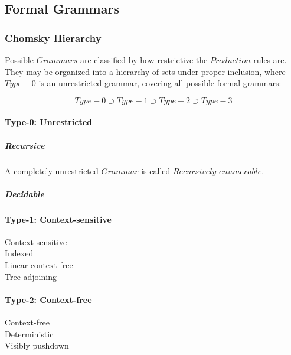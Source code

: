 \documentclass{article}
\begin{document}
\subsection{Formal Grammars}

\subsubsection{Chomsky Hierarchy}

Possible $Grammars$ are classified by how restrictive the $Production$
rules are. They may be organized into a hierarchy of sets under proper
inclusion, where $Type-0$ is an unrestricted grammar, covering all
possible formal grammars:

\[
    Type-0 \supset Type-1 \supset Type-2 \supset Type-3
\]

\paragraph{Type-0: Unrestricted}

    \subparagraph{Recursive}
    A completely unrestricted $Grammar$ is called $Recursively$ $enumerable$.

    \subparagraph{Decidable}

\paragraph{Type-1: Context-sensitive}

    \begin{description}

    \item[Context-sensitive]

    \item[Indexed]

    \item[Linear context-free]

    \item[Tree-adjoining]

    \end{description}

\paragraph{Type-2: Context-free}

    \begin{description}

    \item[Context-free]

    \item[Deterministic]

    \item[Visibly pushdown]

    \end{description}
\end{document}
